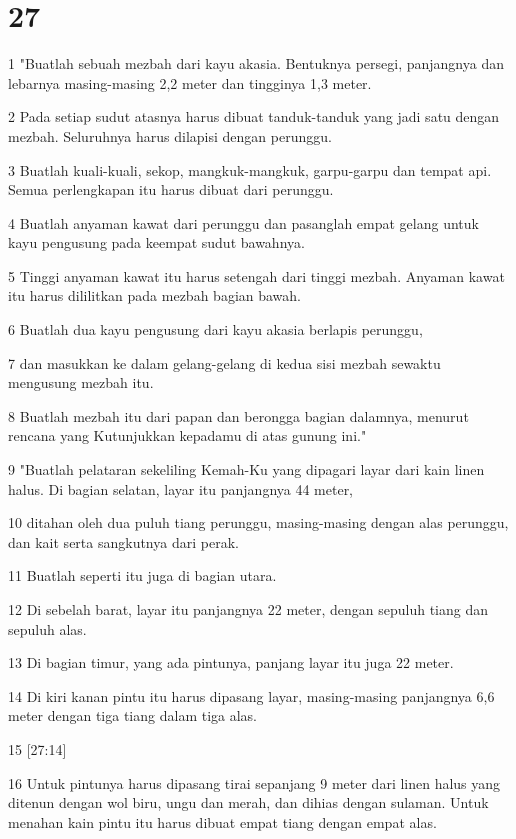 \chapter{27}

\par 1 "Buatlah sebuah mezbah dari kayu akasia. Bentuknya persegi, panjangnya dan lebarnya masing-masing 2,2 meter dan tingginya 1,3 meter.
\par 2 Pada setiap sudut atasnya harus dibuat tanduk-tanduk yang jadi satu dengan mezbah. Seluruhnya harus dilapisi dengan perunggu.
\par 3 Buatlah kuali-kuali, sekop, mangkuk-mangkuk, garpu-garpu dan tempat api. Semua perlengkapan itu harus dibuat dari perunggu.
\par 4 Buatlah anyaman kawat dari perunggu dan pasanglah empat gelang untuk kayu pengusung pada keempat sudut bawahnya.
\par 5 Tinggi anyaman kawat itu harus setengah dari tinggi mezbah. Anyaman kawat itu harus dililitkan pada mezbah bagian bawah.
\par 6 Buatlah dua kayu pengusung dari kayu akasia berlapis perunggu,
\par 7 dan masukkan ke dalam gelang-gelang di kedua sisi mezbah sewaktu mengusung mezbah itu.
\par 8 Buatlah mezbah itu dari papan dan berongga bagian dalamnya, menurut rencana yang Kutunjukkan kepadamu di atas gunung ini."
\par 9 "Buatlah pelataran sekeliling Kemah-Ku yang dipagari layar dari kain linen halus. Di bagian selatan, layar itu panjangnya 44 meter,
\par 10 ditahan oleh dua puluh tiang perunggu, masing-masing dengan alas perunggu, dan kait serta sangkutnya dari perak.
\par 11 Buatlah seperti itu juga di bagian utara.
\par 12 Di sebelah barat, layar itu panjangnya 22 meter, dengan sepuluh tiang dan sepuluh alas.
\par 13 Di bagian timur, yang ada pintunya, panjang layar itu juga 22 meter.
\par 14 Di kiri kanan pintu itu harus dipasang layar, masing-masing panjangnya 6,6 meter dengan tiga tiang dalam tiga alas.
\par 15 [27:14]
\par 16 Untuk pintunya harus dipasang tirai sepanjang 9 meter dari linen halus yang ditenun dengan wol biru, ungu dan merah, dan dihias dengan sulaman. Untuk menahan kain pintu itu harus dibuat empat tiang dengan empat alas.
